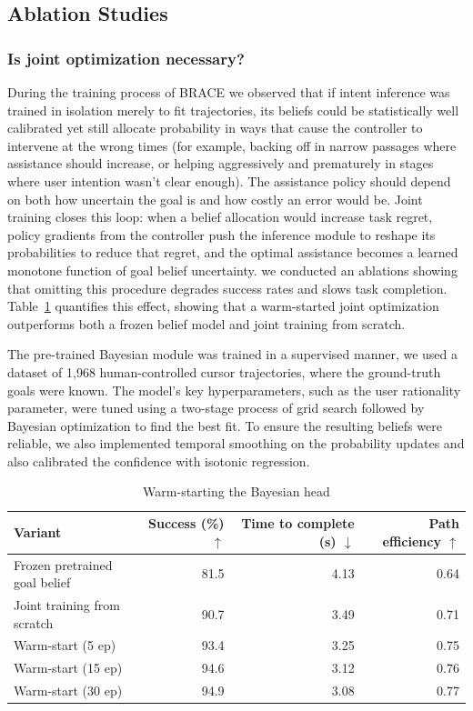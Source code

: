 \documentclass[11pt]{article}
\begin{document}
\subsection{Ablation Studies}


\subsubsection{\textbf{Is joint optimization necessary?}} 

 During the training process of BRACE we observed that if intent inference was trained in isolation merely to fit trajectories, its beliefs could be statistically well calibrated yet still allocate probability in ways that cause the controller to intervene at the wrong times (for example, backing off in narrow passages where assistance should increase, or helping aggressively and prematurely in stages where user intention wasn't clear enough). The assistance policy should depend on both how uncertain the goal is and how costly an error would be. Joint training closes this loop: when a belief allocation would increase task regret, policy gradients from the controller push the inference module to reshape its probabilities to reduce that regret, and the optimal assistance becomes a learned monotone function of goal belief uncertainty. we conducted an ablations showing that omitting this procedure degrades success rates and slows task completion. Table~\ref{tab:my_table} quantifies this effect, showing that a warm-started joint optimization outperforms both a frozen belief model and joint training from scratch.

 The pre-trained Bayesian module was trained in a supervised manner, we used a dataset of 1,968 human-controlled cursor trajectories, where the ground-truth goals were known. The model's key hyperparameters, such as the user rationality parameter, were tuned using a two-stage process of grid search followed by Bayesian optimization to find the best fit. To ensure the resulting beliefs were reliable, we also implemented temporal smoothing on the probability updates and also calibrated the confidence with isotonic regression.

 \begin{table}[h]
\centering
\begin{tabular}{lrrr}
\hline
\textbf{Variant} & \textbf{Success (\%) $\uparrow$} & \textbf{Time to complete (s) $\downarrow$} & \textbf{Path efficiency $\uparrow$} \\
\hline
Frozen pretrained goal belief & 81.5 & 4.13 & 0.64 \\
Joint training from scratch   & 90.7 & 3.49 & 0.71 \\
Warm-start (5 ep)             & 93.4 & 3.25 & 0.75 \\
Warm-start (15 ep)            & 94.6 & 3.12 & 0.76 \\
Warm-start (30 ep)            & 94.9 & 3.08 & 0.77 \\
\hline
\end{tabular}
\caption{Warm-starting the Bayesian head }
\label{tab:my_table}
\end{table}
\end{document}

